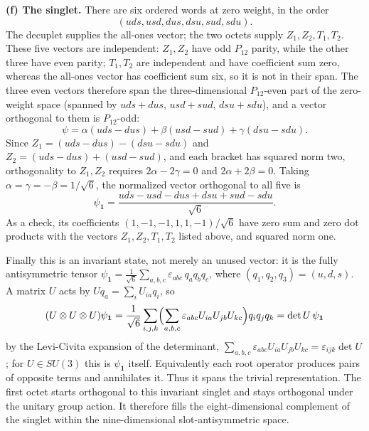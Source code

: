 \textbf{(f) The singlet.}
There are six ordered words at zero weight, in the order
\[
(uds,usd,dus,dsu,sud,sdu).
\]
The decuplet supplies the all-ones vector; the two octets supply
$Z_1,Z_2,T_1,T_2$. These five vectors are independent:
$Z_1,Z_2$ have odd $P_{12}$ parity, while the other three have
even parity; $T_1,T_2$ are independent and have coefficient
sum zero, whereas the all-ones vector has coefficient sum six,
so it is not in their span.
The three even vectors therefore span the three-dimensional
$P_{12}$-even part of the zero-weight space (spanned by $uds+dus$,
$usd+sud$, $dsu+sdu$), and a vector orthogonal to them is $P_{12}$-odd:
\[
\psi=\alpha(uds-dus)+\beta(usd-sud)+\gamma(dsu-sdu).
\]
Since $Z_1=(uds-dus)-(dsu-sdu)$ and $Z_2=(uds-dus)+(usd-sud)$, and
each bracket has squared norm two, orthogonality to $Z_1,Z_2$ requires
$2\alpha-2\gamma=0$ and $2\alpha+2\beta=0$. Taking
$\alpha=\gamma=-\beta=1/\sqrt6$, the normalized vector orthogonal to
all five is
\[
\boxed{\psi_{\mathbf1}
=\frac{uds-usd-dus+dsu+sud-sdu}{\sqrt6}}.
\]
As a check, its coefficients $(1,-1,-1,1,1,-1)/\sqrt6$ have zero
sum and zero dot products with the vectors $Z_1,Z_2,T_1,T_2$
listed above, and squared norm one.

Finally this is an invariant state, not merely an unused vector:
it is the fully antisymmetric tensor
$\psi_{\mathbf1}=\frac1{\sqrt6}\sum_{a,b,c}\varepsilon_{abc}\,q_aq_bq_c$,
where $(q_1,q_2,q_3)=(u,d,s)$. A matrix $U$ acts by
$Uq_a=\sum_iU_{ia}q_i$, so
\[
(U\otimes U\otimes U)\psi_{\mathbf1}
=\frac1{\sqrt6}\sum_{i,j,k}\Bigl(\sum_{a,b,c}\varepsilon_{abc}
U_{ia}U_{jb}U_{kc}\Bigr)q_iq_jq_k=\det U\,\psi_{\mathbf1}
\]
by the Levi-Civita expansion of the determinant,
$\sum_{a,b,c}\varepsilon_{abc}U_{ia}U_{jb}U_{kc}=\varepsilon_{ijk}\det U$;
for $U\in SU(3)$ this is $\psi_{\mathbf1}$ itself.
Equivalently each root operator produces pairs of opposite terms
and annihilates it. Thus it spans the trivial representation.
The first octet starts orthogonal to this invariant singlet and
stays orthogonal under the unitary group action. It therefore fills
the eight-dimensional complement of the singlet within the
nine-dimensional slot-antisymmetric space.

